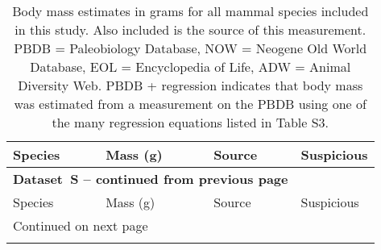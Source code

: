 \documentclass{article}
\renewcommand{\thetable}{S\arabic{table}}
\renewcommand{\tablename}{Dataset}
\begin{document}
\small
\begin{center}
  \begin{longtable}{p{} p{} p{} p{}}
    \caption[Mammal body mass estimates]{Body mass estimates in grams for all mammal species included in this study. Also included is the source of this measurement. PBDB = Paleobiology Database, NOW = Neogene Old World Database, EOL = Encyclopedia of Life, ADW = Animal Diversity Web. PBDB + regression indicates that body mass was estimated from a measurement on the PBDB using one of the many regression equations listed in Table S3.} \label{tab:mass_data} \\

    \hline Species & Mass (g) & Source & Suspicious \\ \hline
    \endfirsthead

    \multicolumn{3}{p{\textwidth}}{{ \bfseries \tablename\ \thetable{} -- continued from previous page}} \\
    \hline Species & Mass (g) & Source & Suspicious \\ \hline
    \endhead

    \hline \multicolumn{3}{p{\textwidth}}{{Continued on next page}} \\ \hline
    \endfoot


\end{longtable}
\end{center}
\end{document}

